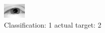 \begin{figure}[h!]
\begin{center}
\includegraphics[width=0.60\columnwidth]{figures/ID2289_class_1_target_2.png}
\end{center}
\caption{ Classification: 1 actual target: 2}
\label{fig:ID2289_class_1_target_2}
\end{figure}
